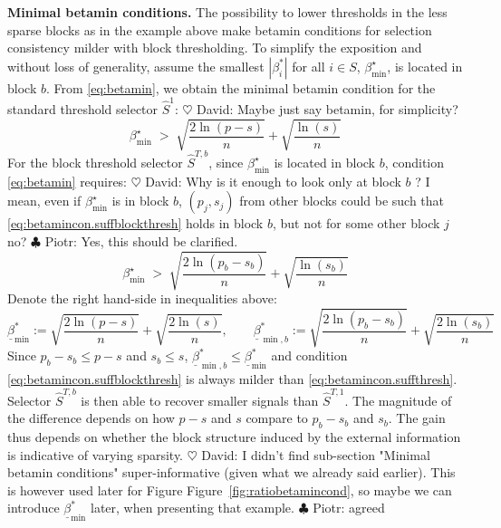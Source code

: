 \documentclass[aos]{imsart}
\theoremstyle{plain}
\newcommand{\david}[1]{{\small{\color{blue} \sf $\heartsuit$ David: #1}}}
\newcommand{\piotr}[1]{{\small{\color{red} \sf $\clubsuit$ Piotr: #1}}}
\begin{document}
\noindent\textbf{Minimal betamin conditions.} The possibility to lower thresholds in the less sparse blocks as in the example above make betamin conditions for selection consistency milder with block thresholding.
To simplify the exposition and without loss of generality, assume the smallest $|\beta_i^*|$ for all $i\in S$, $\beta_{\min}^{\star}$, is located in block $b$. 
From \eqref{eq:betamin}, we obtain the minimal betamin condition for the standard threshold selector $\hat{S}^{1}$:
\david{Maybe just say betamin, for simplicity?}
\begin{equation}\label{eq:betamincon.suffthresh}
    \beta_{\min}^{\star} \;>\; \sqrt{\frac{2\ln(p-s)}{n}}+\sqrt{\frac{\ln(s)}{n}}
\end{equation} 
For the block threshold selector $\hat{S}^{T,b}$, since $\beta_{\min}^{\star}$ is located in block $b$, condition \eqref{eq:betamin} requires:
\david{Why is it enough to look only at block $b$ ? I mean, even if $\beta_{\min}^\star$ is in block $b$, $(p_j,s_j)$ from other blocks could be such that \eqref{eq:betamincon.suffblockthresh} holds in block $b$, but not for some other block $j$ no?}\piotr{Yes, this should be clarified.}
\begin{equation}\label{eq:betamincon.suffblockthresh}
    \beta_{\min}^{\star} \;>\; \sqrt{\frac{2\ln(p_b-s_b)}{n}}+\sqrt{\frac{\ln(s_b)}{n}}
\end{equation} 
Denote the right hand-side in inequalities above: 
\begin{equation}\label{eq:betaminbardef}
    \underline{\beta}_{\min}^{*} := \sqrt{\frac{2\ln(p-s)}{n}} + \sqrt{\frac{2\ln(s)}{n}},\qquad
    \underline{\beta}^{*}_{\min,b} := \sqrt{\frac{2\ln(p_b-s_b)}{n}} + \sqrt{\frac{2\ln(s_b)}{n}}
\end{equation} Since $p_b-s_b \leq p - s$ and $s_b \leq s$, $\underline{\beta}^{*}_{\min,b} \leq \underline{\beta}_{\min}^{*}$ and condition \eqref{eq:betamincon.suffblockthresh} is always milder than \eqref{eq:betamincon.suffthresh}. Selector $\hat{S}^{T,b}$ is then able to recover smaller signals than $\hat{S}^{T,1}$. The magnitude of the difference depends on how $p-s$ and $s$ compare to $p_b-s_b$ and $s_b$. The gain thus depends on whether the block structure induced by the external information is indicative of varying sparsity. \david{I didn't find sub-section "Minimal betamin conditions" super-informative (given what we already said earlier). This is however used later for Figure Figure~\ref{fig:ratiobetamincond}, so maybe we can introduce $\underline{\beta}_{\min}^{*}$ later, when presenting that example.}\piotr{agreed}
\end{document}
